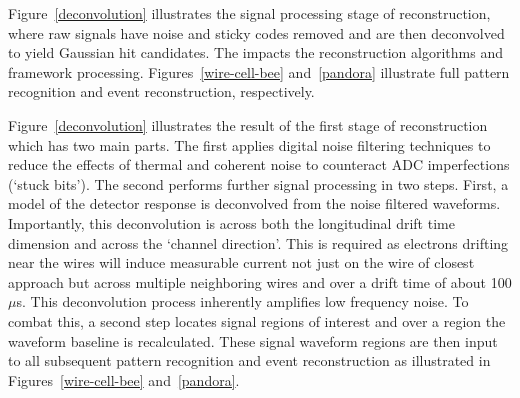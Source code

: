 \documentclass[../main-v1.tex]{subfiles}
\begin{document}
Figure~\ref{deconvolution} illustrates the signal processing stage of reconstruction, where raw  signals have noise and sticky codes removed and are then deconvolved to yield Gaussian hit candidates. %
The impacts the reconstruction algorithms and framework processing. Figures~\ref{wire-cell-bee} and~\ref{pandora} illustrate full pattern recognition and event reconstruction, respectively. 

Figure~\ref{deconvolution} illustrates the result of the first stage of reconstruction which has two main parts. The first applies digital noise filtering techniques to reduce the effects of thermal and coherent noise to counteract ADC imperfections (`stuck bits'). The second performs further signal processing in two steps. First, a model of the detector response is deconvolved from the noise filtered waveforms. Importantly, this deconvolution is across both the longitudinal drift time dimension and across the `channel direction'. This is required as electrons drifting near the wires will induce measurable current not just on the wire of closest approach but across multiple neighboring wires and over a drift time of about 100 $\mu$s. This deconvolution process inherently amplifies low frequency noise. To combat this, a second step locates signal regions of interest and over a region the waveform baseline is recalculated. These signal waveform regions are then input to all subsequent pattern recognition and event reconstruction as illustrated in Figures~\ref{wire-cell-bee} and~\ref{pandora}.

\end{document}
